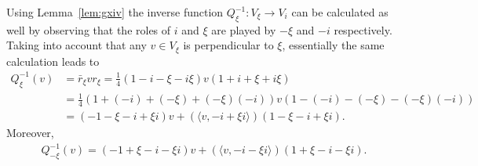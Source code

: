 \documentclass[pdftex]{sigma}
\numberwithin{equation}{section}
\begin{document}
Using Lemma~\ref{lem:gxiv} the inverse function $Q_{\xi}^{-1}\colon V_\xi \rightarrow V_i$ can be calculated as well by observing that the roles of $i$ and $\xi$ are played by $-\xi$ and $-i$ respectively. Taking into account that any $v\in V_\xi$ is perpendicular to $\xi$, essentially the same calculation leads to
\begin{align*}
Q_\xi^{-1}(v) &=\bar{r}_\xi v r_\xi=\frac{1}{4}(1-i-\xi-i\xi)v(1+i+\xi+i\xi)\\
&=\frac{1}{4}(1+(-i)+(-\xi)+(-\xi)(-i))v(1-(-i)-(-\xi)-(-\xi)(-i))\\
&=(-1-\xi-i+\xi i) v + (\langle v, -i + \xi i \rangle )(1-\xi-i+\xi i).
\end{align*}
Moreover,
\begin{gather*}
Q_{-\xi}^{-1}(v)=(-1+\xi-i-\xi i) v + (\langle v, -i - \xi i \rangle )(1+\xi-i-\xi i).
\end{gather*}
\end{document}

